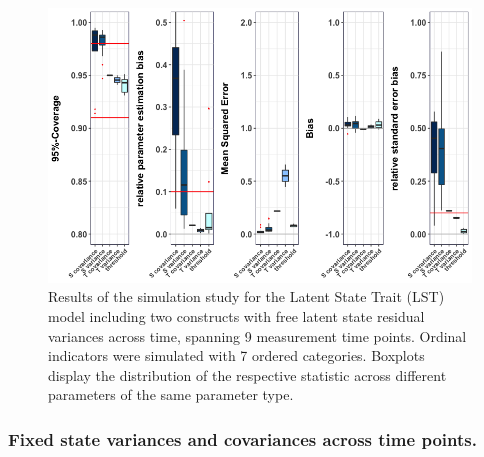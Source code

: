   \begin{figure}[H]
 \begin{adjustwidth}{-1cm}{-1cm}
    \begin{center}
  \includegraphics[width=1\textwidth]{Boxplot_LST_2constructs_freeSvar.png}
   \end{center}
    \end{adjustwidth}
      \captionsetup{skip=10pt,width=1.05\textwidth}
\caption[Results LST free variance two constructs]{Results of the simulation study for the Latent State Trait (LST) model including two constructs with free latent state residual variances across time, spanning 9 measurement time points.  Ordinal indicators were simulated with 7 ordered categories. Boxplots display the distribution of the respective statistic across different parameters of the same parameter type.}
\label{Fig: LST two free}
\end{figure}


 \subsubsection{Fixed state variances and covariances across time points.}

